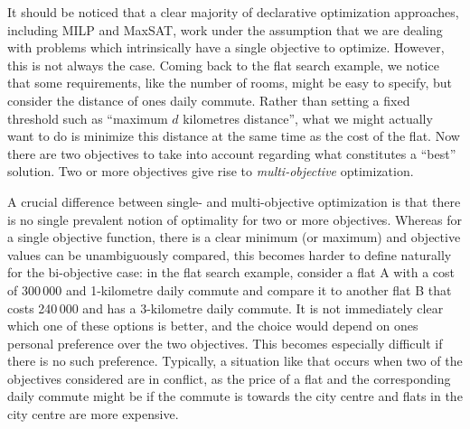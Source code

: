 It should be noticed that a clear majority of declarative optimization approaches, including MILP and MaxSAT, work under the assumption that we are dealing with problems which intrinsically have a single objective to optimize.
However, this is not always the case.
Coming back to the flat search example, we notice that some requirements, like the number of rooms, might be easy to specify, but consider the distance of ones daily commute.
Rather than setting a fixed threshold such as ``maximum $d$ kilometres distance'', what we might actually want to do is minimize this distance at the same time as the cost of the flat.
Now there are two objectives to take into account regarding what constitutes a ``best'' solution.
Two or more objectives give rise to \emph{multi-objective} optimization.

A crucial difference between single- and multi-objective optimization is that there is no single prevalent notion of optimality for two or more objectives.
Whereas for a single objective function, there is a clear minimum (or maximum) and objective values can be unambiguously compared, this becomes harder to define naturally for the bi-objective case:
in the flat search example, consider a flat A with a cost of 300\,000 \texteuro{} and 1-kilometre daily commute and compare it to another flat B that costs 240\,000 \texteuro{} and has a 3-kilometre daily commute.
It is not immediately clear which one of these options is better, and the choice would depend on ones personal preference over the two objectives.
This becomes especially difficult if there is no such preference.
Typically, a situation like that occurs when two of the objectives considered are in conflict, as the price of a flat and the corresponding daily commute might be if the commute is towards the city centre and flats in the city centre are more expensive.

